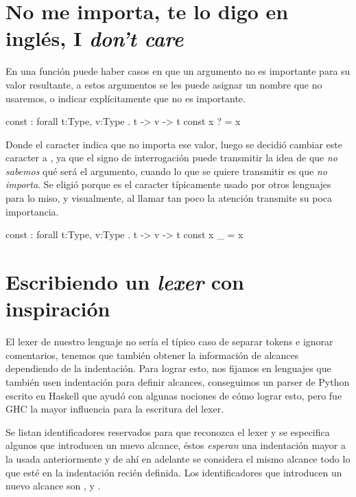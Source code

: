 {\section{No me importa, te lo digo en inglés, I \emph{don't care}}

\begin{designfr}
En una función puede haber casos en que un argumento no es importante para su valor resultante, a estos argumentos se les puede asignar un nombre que no usaremos, o indicar explícitamente que no es importante.

\begin{anglercode}
const : forall t:Type, v:Type . t -> v -> t
const x ? = x
\end{anglercode}

Donde el caracter  indica que no importa ese valor, luego se decidió cambiar este caracter a \inlinecode{\_}, ya que el signo de interrogación puede transmitir la idea de que \emph{no sabemos} qué será el argumento, cuando lo que se quiere transmitir es que \emph{no importa}. Se eligió \inlinecode{\_} porque es el caracter típicamente usado por otros lenguajes para lo miso, y visualmente, al llamar tan poco la atención transmite su poca importancia.

\begin{anglercode}
const : forall t:Type, v:Type . t -> v -> t
const x _ = x
\end{anglercode}
\end{designfr}

\section{Escribiendo un \emph{lexer} con inspiración}

\begin{investigationfr}
El lexer de nuestro lenguaje no sería el típico caso de separar tokens e ignorar comentarios, tenemos que también obtener la información de alcances dependiendo de la indentación. Para lograr esto, nos fijamos en lenguajes que también usen indentación para definir alcances, conseguimos un parser de Python escrito en Haskell \cite{python-parser} que ayudó con algunas nociones de cómo lograr esto, pero fue GHC \cite{ghc} la mayor influencia para la escritura del lexer.
\end{investigationfr}

\begin{implementationfr}
Se listan identificadores reservados para que reconozca el lexer y se especifica algunos que introducen un nuevo alcance, éstos \emph{esperan} una indentación mayor a la usada anteriormente y de ahí en adelante se considera el mismo alcance todo lo que esté en la indentación recién definida. Los identificadores que introducen un nuevo alcance son ,  y .
\end{implementationfr}

}

